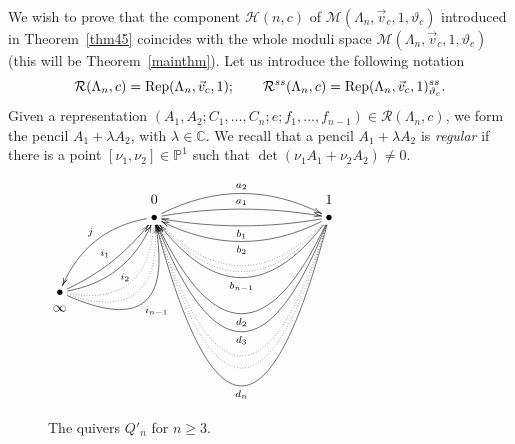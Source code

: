 \documentclass[11pt]{article}
\numberwithin{equation}{section}
\numberwithin{equation}{section}
\begin{document}
We wish to prove that the component $\mathcal{H} (n,c) $ of $\mathcal{M}(\Lambda_n,\vec{v}_c, 1, \vartheta_c) $ introduced in Theorem~\ref{thm45} coincides with the whole moduli space $\mathcal{M}(\Lambda_n,\vec{v}_c, 1, \vartheta_c)$ (this will be Theorem~\ref{mainthm}). Let us introduce the following notation
\begin{equation*}%
\mathcal{R}(\Lambda_n,c)= \operatorname{Rep}(\Lambda_n,\vec{v}_c,1) ;\qquad \mathcal{R}^{\rm ss}(\Lambda_n,c) =\operatorname{Rep}(\Lambda_n,\vec{v}_c,1)_ {\vartheta_c}^{\rm ss} .
\end{equation*}
Given a representation $(A_1,A_2;C_1, \dots,C_n;e;f_1,\dots,f_{n-1}) \in \mathcal{R}(\Lambda_n,c)$, we form the pencil $A_1 + \lambda A_2$, with $\lambda\in \mathbb{C}$. We recall that a pencil $A_1 + \lambda A_2$ is {\it regular}
if there is a point $[\nu_1,\nu_2]\in \mathbb{P}^1$ such that $\det (\nu_1 A_1 + \nu_2 A_2) \neq 0$.

\begin{figure}[t]\centering
$ \xymatrix@R-2.3em{
&&\mbox{\scriptsize$0$}&&&&\mbox{\scriptsize$1$}\\
&&\bullet\ar@/_3ex/[llddddddd]_{j}\ar@/^/[rrrr]^{a_{1}}\ar@/^4ex/[rrrr]^{a_{2}}&&&&\bullet\ar@/^/[llll]^{b_{1}}
\ar@/^4ex/[llll]^{b_2}\ar@{..}@/^8ex/[llll]\ar@{..}@/^9ex/[llll]
\ar@/^10ex/[llll]^{b_{n-1}} \ar@/^16ex/[llll]^{d_{2}} \ar@/^19ex/[llll]^{d_{3}} \ar@{..}@/^23ex/[llll] \ar@{..}@/^25ex/[llll] \ar@/^28ex/[llll]^{d_{n}} \\ \\ \\ \\ \\ \\ \\
\bullet\ar@/_/[rruuuuuuu]^{i_1}\ar@/_3ex/[rruuuuuuu]_{i_2}\ar@{..}@/_6ex/[rruuuuuuu]\ar@{..}@/_8ex/[rruuuuuuu]\ar@/_10ex/[rruuuuuuu]_{i_{n-1}}&&&&&\\
\mbox{\scriptsize$\infty$}&&&&
}
$
\caption{The quivers $Q'_n$ for $n\ge 3$.}\label{Q'n}
\end{figure}
\end{document}
